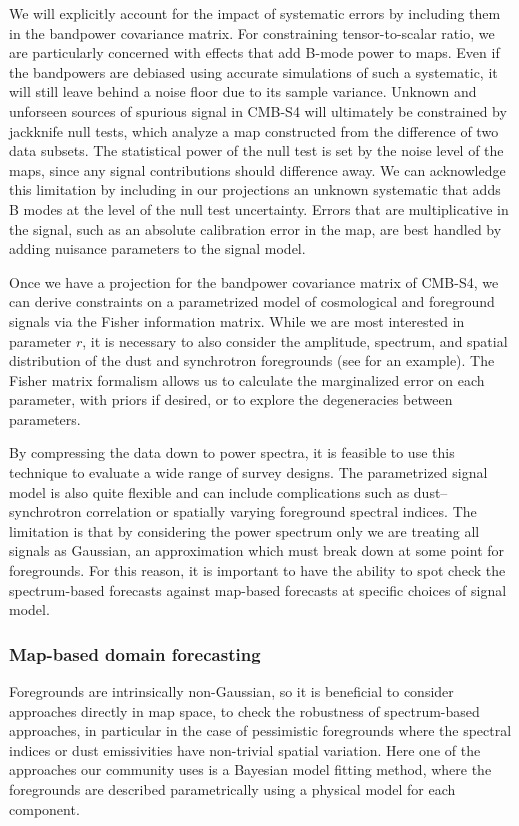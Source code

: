 We will explicitly account for the impact of systematic errors by including them in the bandpower covariance matrix.
For constraining tensor-to-scalar ratio, we are particularly concerned with effects that add B-mode power to maps.
Even if the bandpowers are debiased using accurate simulations of such a systematic, it will still leave behind a noise floor due to its sample variance.
Unknown and unforseen sources of spurious signal in CMB-S4 will ultimately be constrained by jackknife null tests, which analyze a map constructed from the difference of two data subsets.
The statistical power of the null test is set by the noise level of the maps, since any signal contributions should difference away.
We can acknowledge this limitation by including in our projections an unknown systematic that adds B modes at the level of the null test uncertainty.
Errors that are multiplicative in the signal, such as an absolute calibration error in the map, are best handled by adding nuisance parameters to the signal model.

Once we have a projection for the bandpower covariance matrix of CMB-S4, we can derive constraints on a parametrized model of cosmological and foreground signals via the Fisher information matrix.
While we are most interested in parameter $r$, it is necessary to also consider the amplitude, spectrum, and spatial distribution of the dust and synchrotron foregrounds (see \cite{Ade:2015tva} for an example).
The Fisher matrix formalism allows us to calculate the marginalized error on each parameter, with priors if desired, or to explore the degeneracies between parameters.

By compressing the data down to power spectra, it is feasible to use this technique to evaluate a wide range of survey designs.
The parametrized signal model is also quite flexible and can include complications such as dust--synchrotron correlation or spatially varying foreground spectral indices.
The limitation is that by considering the power spectrum only we are treating all signals as Gaussian, an approximation which must break down at some point for foregrounds.
For this reason, it is important to have the ability to spot check the spectrum-based forecasts against map-based forecasts at specific choices of signal model.

\subsubsection{Map-based domain forecasting}

Foregrounds are intrinsically non-Gaussian, so it is beneficial to consider approaches directly in map space, to check the robustness of spectrum-based approaches, in particular in the case of pessimistic foregrounds where the spectral indices or dust emissivities have non-trivial spatial variation. Here one of the approaches our community uses is a Bayesian model fitting method, where the foregrounds are described parametrically using a physical model for each component.

